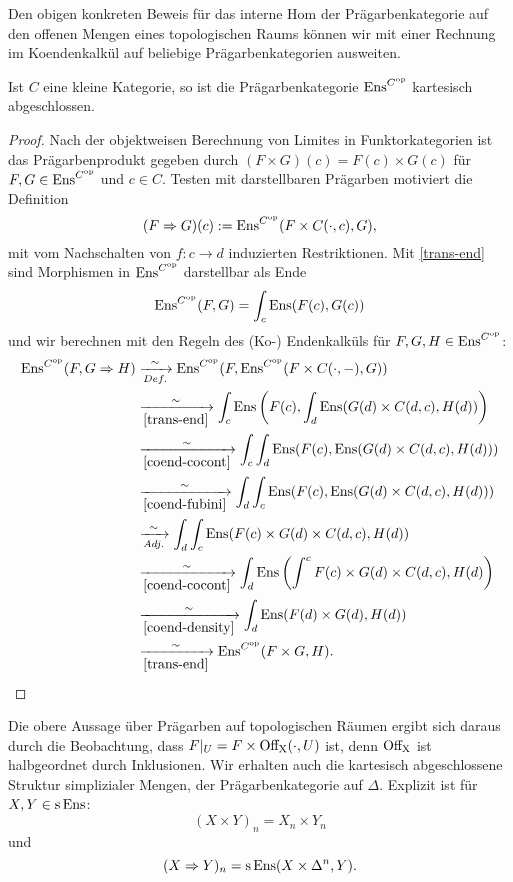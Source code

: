 Den obigen konkreten Beweis für das interne Hom der Prägarbenkategorie
auf den offenen Mengen eines topologischen Raums können wir mit einer
Rechnung im Koendenkalkül auf beliebige Prägarbenkategorien ausweiten.
\begin{prop}
  Ist $C$ eine kleine Kategorie, so ist die Prägarbenkategorie
  $\operatorname{Ens}^{C^\mathrm{op}}$ kartesisch abgeschlossen.
\end{prop}
\begin{proof}
  Nach der objektweisen Berechnung von Limites in Funktorkategorien
  ist das Prägarbenprodukt gegeben durch $(F \times G)(c) = F(c)
  \times G(c)$ für $F, G \in \operatorname{Ens}^{C^\mathrm{op}}$ und $c \in C$. Testen mit
  darstellbaren Prägarben motiviert die Definition
  \[ (F \Rightarrow G)(c) := \operatorname{Ens}^{C^\mathrm{op}}(F \times C(\cdot, c), G), \]
  mit vom Nachschalten von $f: c \to d$ induzierten Restriktionen.
  Mit \ref{trans-end} sind Morphismen in $\operatorname{Ens}^{C^\mathrm{op}}$ darstellbar als
  Ende
  \[ \operatorname{Ens}^{C^\mathrm{op}}(F, G) = \int_c \operatorname{Ens}(F(c), G(c)) \]
  und wir berechnen mit den Regeln des (Ko-) Endenkalküls für $F, G, H
  \in \operatorname{Ens}^{C^\mathrm{op}}$:
  \begin{align*}
    \operatorname{Ens}^{C^\mathrm{op}}(F, G \Rightarrow H)
    &\xrightarrow[Def.]{\sim} \operatorname{Ens}^{C^\mathrm{op}} (F, \operatorname{Ens}^{C^\mathrm{op}}(F \times C(\cdot, -), G)) \\
    &\xrightarrow[\ref{trans-end}]{\sim}
     \int_c \operatorname{Ens} \left( F(c), \int_d \operatorname{Ens}(G(d) \times C(d, c), H(d)) \right) \\
    &\xrightarrow[\ref{coend-cocont}]{\sim}
     \int_c \int_d \operatorname{Ens}(F(c), \operatorname{Ens}(G(d) \times C(d, c), H(d))) \\
    &\xrightarrow[\ref{coend-fubini}]{\sim}
     \int_d \int_c \operatorname{Ens}(F(c), \operatorname{Ens}(G(d) \times  C(d, c), H(d))) \\
    &\xrightarrow[Adj.]{\sim} \int_d \int_c \operatorname{Ens}(F(c) \times G(d) \times C(d, c), H(d)) \\
    &\xrightarrow[\ref{coend-cocont}]{\sim}
     \int_d \operatorname{Ens} \left( \int^c F(c) \times G(d) \times C(d, c), H(d) \right) \\
    &\xrightarrow[\ref{coend-density}]{\sim}
     \int_d \operatorname{Ens}( F(d) \times G(d), H(d)) \\
    &\xrightarrow[\ref{trans-end}]{\sim}
     \operatorname{Ens}^{C^\mathrm{op}}(F \times G, H).
  \end{align*}
\end{proof}
Die obere Aussage über Prägarben auf topologischen Räumen ergibt sich
daraus durch die Beobachtung, dass $F|_U = F \times \operatorname{Off_X}(\cdot, U)$
ist, denn $\operatorname{Off_X}$ ist halbgeordnet durch Inklusionen. Wir erhalten
auch die kartesisch abgeschlossene Struktur simplizialer Mengen, der
Prägarbenkategorie auf $\Delta$. Explizit ist für $X, Y \in \operatorname{s}\operatorname{Ens}$:
\[ (X \times Y)_n = X_n \times Y_n \]
und
\[ (X \Rightarrow Y)_n = \operatorname{s}\operatorname{Ens}(X \times \Delta^n, Y). \]

